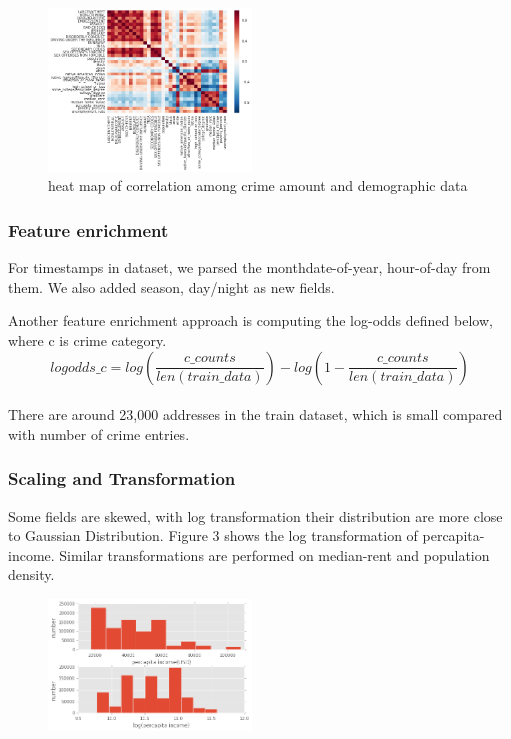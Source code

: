 \documentclass[11pt,conference]{IEEEtran}
\begin{document}
\begin{figure}[H]
\begin{center}
\includegraphics [width=0.48\textwidth]{pics/nh_category_corr.png}
\caption{heat map of correlation among crime amount and demographic data}
\end{center}
\end{figure}

\subsubsection{Feature enrichment}
For timestamps in dataset, we parsed the month\/date-of-year, hour-of-day from them. We also added season, day/night as new fields.

Another feature enrichment approach is computing the log-odds defined below, where c is crime category.
$$logodds\_c = log(\frac{c\_counts}{len(train\_data)}) - log(1 - \frac{c\_counts}{len(train\_data)})$$\\ There are around 23,000 addresses in the train dataset, which is small compared with number of crime entries. 

\subsubsection{Scaling and Transformation}
Some fields are skewed, with log transformation their distribution are more close to Gaussian Distribution. Figure 3 shows the log transformation of percapita-income. Similar transformations are performed on median-rent and population density.
\begin{figure}[H]
\begin{center}
\includegraphics [width=0.48\textwidth]{pics/percapita_income_log.png}
\caption{}
\end{center}
\end{figure}
\end{document}
